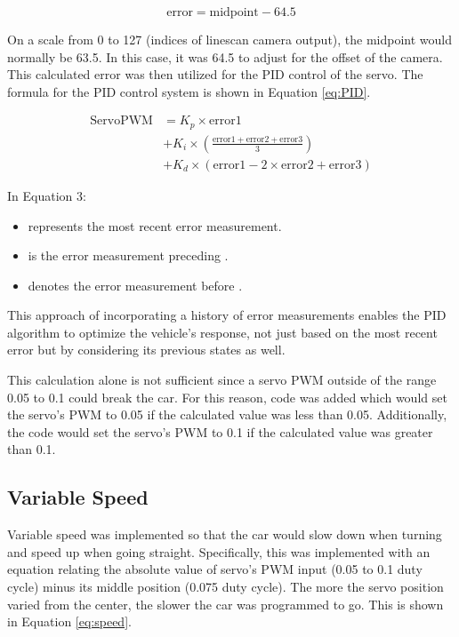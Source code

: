 \documentclass[conference]{IEEEtran}
\begin{document}
\begin{equation}
	\text{error} = \text{midpoint} - 64.5 \label{eq:error}
\end{equation}

On a scale from 0 to 127 (indices of linescan camera output), the midpoint would normally be 63.5. In this case, it was 64.5 to adjust for the offset of the camera. This calculated error was then utilized for the PID control of the servo. The formula for the PID control system is shown in Equation \ref{eq:PID}.

\begin{equation}
	\begin{aligned}
		\text{ServoPWM} &= K_p \times \text{error1} \\
					&+ K_i \times \left( \frac{\text{error1} + \text{error2} + \text{error3}}{3} \right) \\
					&+ K_d \times (\text{error1} - 2 \times \text{error2} + \text{error3})
	\end{aligned}
	\label{eq:PID}
\end{equation}

In Equation 3:
\begin{itemize}
\item {} represents the most recent error measurement.
\item {} is the error measurement preceding .
\item {} denotes the error measurement before .
\end{itemize}
This approach of incorporating a history of error measurements enables the PID algorithm to optimize the vehicle's response, not just based on the most recent error but by considering its previous states as well.

This calculation alone is not sufficient since a servo PWM outside of the range 0.05 to 0.1 could break the car. For this reason, code was added which would set the servo's PWM to 0.05 if the calculated value was less than 0.05. Additionally, the code would set the servo's PWM to 0.1 if the calculated value was greater than 0.1.

\subsection{Variable Speed}

Variable speed was implemented so that the car would slow down when turning and speed up when going straight. Specifically, this was implemented with an equation relating the absolute value of servo's PWM input (0.05 to 0.1 duty cycle) minus its middle position (0.075 duty cycle). The more the servo position varied from the center, the slower the car was programmed to go. This is shown in Equation \ref{eq:speed}.
\end{document}
